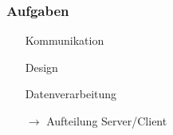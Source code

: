 \begin{frame}
	\frametitle{Aufgaben}
	\begin{itemize}
		\item[] Kommunikation
		\item[] Design
		\item[] Datenverarbeitung
		\item[$\rightarrow$] Aufteilung Server/Client
	\end{itemize}
\end{frame}
